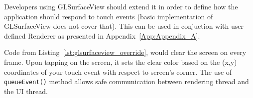 %

Developers using GLSurfaceView should extend it in order to define how the application should respond to touch events (basic implementation of GLSurfaceView does not cover that). 
This can be used in conjuction with user defined Renderer as presented in Appendix~\ref{App:Appendix_A}. 

%

Code from Listing~\ref{lst:glsurfaceview_override}, would clear the screen on every frame.
Upon tapping on the screen, it sets the clear color based on the (x,y) coordinates of your touch event with respect to screen's corner.
The use of \texttt{queueEvent()} method allows safe communication between rendering thread and the UI thread.